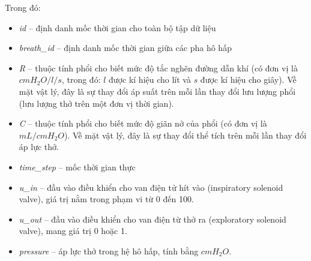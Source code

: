 \documentclass{article}
\begin{document}
Trong đó:
\begin{itemize}
\item \textit{id} -- định danh mốc thời gian cho toàn bộ tập dữ liệu
\item \textit{breath\_id} -- định danh mốc thời gian giữa các pha hô hấp

\item \textit{R} -- thuộc tính phổi cho biết mức độ tắc nghẽn đường dẫn khí (có đơn vị là $cmH_{2}O / l / s$, trong đó: $l$ được kí hiệu cho lít và $s$ được kí hiệu cho giây). Về mặt vật lý, đây là sự thay đổi áp suất trên mỗi lần thay đổi lưu lượng phổi (lưu lượng thở trên một đơn vị thời gian). 

\item \textit{C} -- thuộc tính phổi cho biết mức độ giãn nở của phổi (có đơn vị là $mL / cmH_{2}O$). Về mặt vật lý, đây là sự thay đổi thể tích trên mỗi lần thay đổi áp lực thở. 
\item \textit{time\_step} -- mốc thời gian thực

\item \textit{u\_in} -- đầu vào điều khiển cho van điện tử hít vào (inspiratory solenoid valve), giá trị nằm trong phạm vi từ 0 đến 100.
\item \textit{u\_out} -- đầu vào điều khiển cho van điện từ thở ra (exploratory solenoid valve), mang giá trị 0 hoặc 1.
\item \textit{pressure} -- áp lực thở trong hệ hô hấp, tính bằng $cmH_2O$.
\end{itemize}
\end{document}
